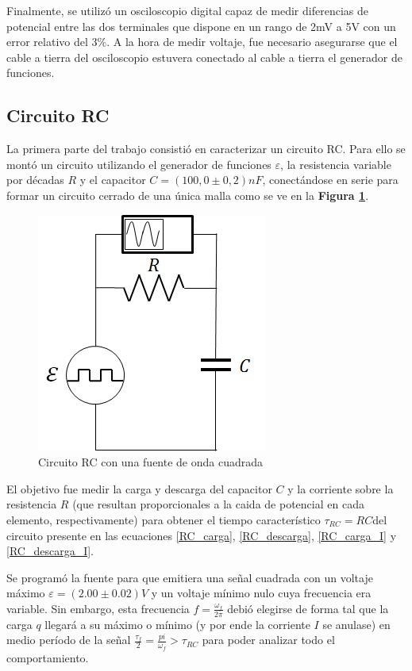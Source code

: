 \documentclass[11pt,a4paper]{article}
\begin{document}
Finalmente, se utilizó un osciloscopio digital capaz de medir diferencias de potencial entre las dos terminales que dispone en un rango de 2mV a 5V con un error relativo del $3\%$. A la hora de medir voltaje, fue necesario asegurarse que el cable a tierra del osciloscopio estuvera conectado al cable a tierra el generador de funciones. 

\subsection{Circuito RC}

La primera parte del trabajo consistió en caracterizar un circuito RC. Para ello se montó un circuito utilizando el generador de funciones $\varepsilon$, la resistencia variable por décadas $R$ y el capacitor $C = (100,0 \pm 0,2)nF$, conectándose en serie para formar un circuito cerrado de una única malla como se ve en la \textbf{Figura \ref{fig:RC}}. 

\begin{figure}[h]
\centering
  \includegraphics[scale=0.7]{Circuito-RC}
  \caption{Circuito RC con una fuente de onda cuadrada}
  \label{fig:RC}
\end{figure}

El objetivo fue medir la carga y descarga del capacitor $C$ y la corriente sobre la resistencia $R$ (que resultan proporcionales a la caida de potencial en cada elemento, respectivamente) para obtener el tiempo característico $\tau_{RC} = RC$del circuito presente en las ecuaciones \eqref{RC_carga}, \eqref{RC_descarga}, \eqref{RC_carga_I} y \eqref{RC_descarga_I}.
 
Se programó la fuente para que emitiera una señal cuadrada con un voltaje máximo $\varepsilon = (2.00 \pm 0.02)V$ y un voltaje mínimo nulo cuya frecuencia era variable. Sin embargo, esta frecuencia $f = \frac{\omega_f}{2\pi}$ debió elegirse de forma tal que la carga $q$ llegará a su máximo o mínimo (y por ende la corriente $I$ se anulase) en medio período de la señal $\frac{\tau_f}{2} = \frac{pi}{\omega_f} > \tau_{RC}$ para poder analizar todo el comportamiento.
\end{document}
